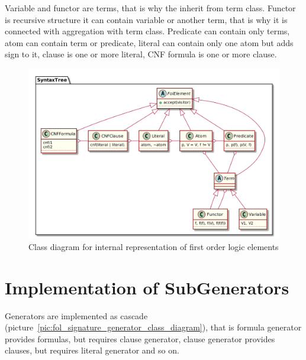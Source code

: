Variable and functor are terms, that is why the inherit from term class. Functor is recursive structure it can contain variable or another term, that is why it is connected with aggregation with term class. Predicate can contain only terms, atom can contain term or predicate, literal can contain only one atom but adds sign to it, clause is one or more literal, CNF formula is one or more clause.

\begin{figure}[h]
\begin{centering}
  \includegraphics[width=\textwidth]{logic-formula-generator/fol/cnf_fol_elements.png}
  \caption{Class diagram for internal representation of first order logic elements}
  \label{pic:fol_elements_class_diagram}
\end{centering}
\end{figure}

\section{Implementation of SubGenerators}
\label{sec:Generators}

Generators are implemented as cascade (picture~\ref{pic:fol_signature_generator_class_diagram}), that is formula generator provides formulas, but requires clause generator, clause generator provides clauses, but requires literal generator and so on.

